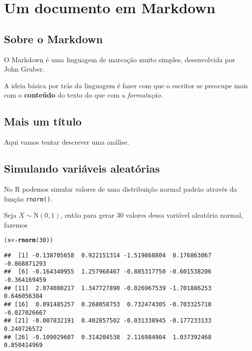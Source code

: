 \documentclass{article}\usepackage[]{graphicx}\usepackage[]{color}
\makeatletter
\newcommand{\hlnum}[1]{\textcolor[rgb]{0.686,0.059,0.569}{#1}}%
\newcommand{\hlstd}[1]{\textcolor[rgb]{0.345,0.345,0.345}{#1}}%
\newcommand{\hlkwb}[1]{\textcolor[rgb]{0.69,0.353,0.396}{#1}}%
\newcommand{\hlkwd}[1]{\textcolor[rgb]{0.737,0.353,0.396}{\textbf{#1}}}%
\newenvironment{kframe}{%
 \def\at@end@of@kframe{}%
 \ifinner\ifhmode%
  \def\at@end@of@kframe{\end{minipage}}%
  \begin{minipage}{\columnwidth}%
 \fi\fi%
 \def\FrameCommand##1{\hskip\@totalleftmargin \hskip-\fboxsep
 \colorbox{shadecolor}{##1}\hskip-\fboxsep
     \hskip-\linewidth \hskip-\@totalleftmargin \hskip\columnwidth}%
 \MakeFramed {\advance\hsize-\width
   \@totalleftmargin\z@ \linewidth\hsize
   \@setminipage}}%
 {\par\unskip\endMakeFramed%
 \at@end@of@kframe}
\newenvironment{knitrout}{}{} %
\makeatother
\begin{document}
\section{Um documento em Markdown}

\subsection{Sobre o Markdown}

O Markdown é uma linguagem de marcação muito simples, desenvolvida por
John Gruber.

A ideia básica por trás da linguagem é fazer com que o escritor se
preocupe mais com o \textbf{conteúdo} do texto do que com a
\emph{formatação}.

\subsection{Mais um título}

Aqui vamos tentar descrever uma análise.

\subsection{Simulando variáveis aleatórias}

No R podemos simular valores de uma distribuição normal padrão através
da função \texttt{rnorm()}.

Seja $X \sim \text{N}(0,1)$, então para gerar 30 valores dessa
variável aleatório normal, fazemos

\begin{knitrout}
\color{fgcolor}\begin{kframe}
\begin{alltt}
\hlstd{(x} \hlkwb{<-} \hlkwd{rnorm}\hlstd{(}\hlnum{30}\hlstd{))}
\end{alltt}
\begin{verbatim}
##  [1] -0.138705658  0.922151314 -1.519868804  0.176863067 -0.868871293
##  [6] -0.164340955  1.257968467 -0.885317750 -0.601538206 -0.364169459
## [11]  2.074080217  1.347727890 -0.026967539 -1.701886253  0.646056384
## [16]  0.091485257  0.268058753  0.732474305 -0.703325710 -0.027026667
## [21] -0.007832191  0.402857502 -0.031338945 -0.177233133  0.240726572
## [26] -0.109029607  0.314204538  2.116984904  1.037392468  0.850414969
\end{verbatim}
\end{kframe}
\end{knitrout}
\end{document}
